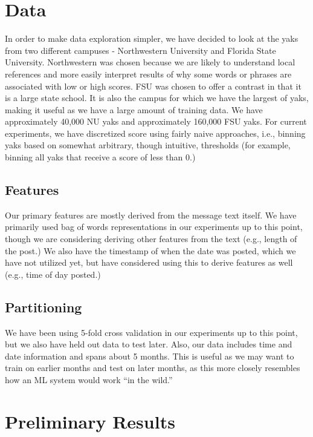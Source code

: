 \documentclass{sigchi}
\begin{document}
\section{Data}

In order to make data exploration simpler, we have decided to look at the yaks
from two different campuses - Northwestern University and Florida State
University. Northwestern was chosen because we are likely to understand local
references and more easily interpret results of why some words or phrases are
associated with low or high scores. FSU was chosen to offer a contrast in that
it is a large state school. It is also the campus for which we have the largest of
yaks, making it useful as we have a large amount of training data. We have
approximately 40,000 NU yaks and approximately 160,000 FSU yaks. For current
experiments, we have discretized score using fairly naive approaches, i.e.,
binning yaks based on somewhat arbitrary, though intuitive, thresholds (for
example, binning all yaks that receive a score of less than 0.)

\subsection{Features}

Our primary features are mostly derived from the message text itself. We have primarily
used bag of words representations in our experiments up to this point, though
we are considering deriving other features from the text (e.g., length of the
post.) We also have the timestamp of when the date was posted, which we have not
utilized yet, but have considered using this to derive features as well (e.g., time
of day posted.)

\subsection{Partitioning}

We have been using 5-fold cross validation in our experiments up to this point,
but we also have held out data to test later. Also, our data includes time and
date information and spans about 5 months. This is useful as we may want to
train on earlier months and test on later months, as this more closely resembles
how an ML system would work ``in the wild.''

\section{Preliminary Results}
\end{document}
